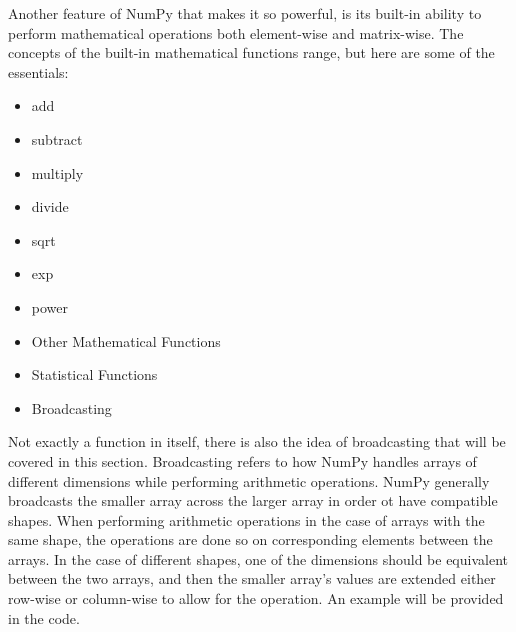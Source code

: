 Another feature of NumPy that makes it so powerful, is its built-in ability to perform mathematical operations both element-wise and matrix-wise. The concepts of the built-in mathematical functions range, but here are some of the essentials:

\begin{itemize}
	\item add
	\item subtract
	\item multiply
	\item divide
	\item sqrt
	\item exp
	\item power
	\item Other Mathematical Functions
	\item Statistical Functions
	\item Broadcasting
\end{itemize}

Not exactly a function in itself, there is also the idea of broadcasting that will be covered in this section. Broadcasting refers to how NumPy handles arrays of different dimensions while performing arithmetic operations. NumPy generally broadcasts the smaller array across the larger array in order ot have compatible shapes. When performing arithmetic operations in the case of arrays with the same shape, the operations are done so on corresponding elements between the arrays. In the case of different shapes, one of the dimensions should be equivalent between the two arrays, and then the smaller array's values are extended either row-wise or column-wise to allow for the operation. An example will be provided in the code.

